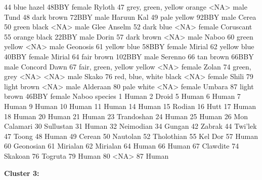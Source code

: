 \documentclass [a4paper] {article}
\begin{document}
\begin{Schunk}
\begin{Soutput}
44                blue     hazel      48BBY        female         Ryloth
47 grey, green, yellow    orange       <NA>          male           Tund
48                dark     brown      72BBY          male     Haruun Kal
49                pale    yellow      92BBY          male          Cerea
50               green     black       <NA>          male    Glee Anselm
52                dark      blue       <NA>        female      Coruscant
55              orange     black      22BBY          male          Dorin
57                dark     brown       <NA>          male          Naboo
60               green    yellow       <NA>          male       Geonosis
61              yellow      blue      58BBY        female         Mirial
62              yellow      blue      40BBY        female         Mirial
64                fair     brown     102BBY          male        Serenno
66                 tan     brown      66BBY          male   Concord Dawn
67 fair, green, yellow    yellow       <NA>        female          Zolan
74         green, grey      <NA>       <NA>          male          Skako
76    red, blue, white     black       <NA>        female          Shili
79               light     brown       <NA>          male       Alderaan
80                pale     white       <NA>        female         Umbara
87               light     brown      46BBY        female          Naboo
        species
1         Human
2         Droid
5         Human
6         Human
7         Human
9         Human
10        Human
11        Human
14        Human
15       Rodian
16         Hutt
17        Human
18        Human
20        Human
21        Human
23   Trandoshan
24        Human
25        Human
26 Mon Calamari
30    Sullustan
31        Human
32    Neimodian
34       Gungan
42       Zabrak
44      Twi'lek
47        Toong
48        Human
49       Cerean
50     Nautolan
52   Tholothian
55      Kel Dor
57        Human
60    Geonosian
61     Mirialan
62     Mirialan
64        Human
66        Human
67     Clawdite
74      Skakoan
76      Togruta
79        Human
80         <NA>
87        Human
\end{Soutput}
\end{Schunk}

\textbf{Cluster 3:}
\end{document}
